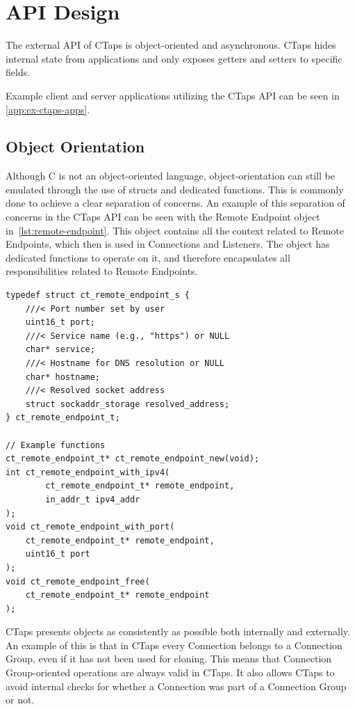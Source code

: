 \section{API Design}
The external API of CTaps is object-oriented and asynchronous.
CTaps hides internal state from applications and only exposes getters and setters
to specific fields.

Example client and server applications utilizing the CTaps
API can be seen in \cref{app:ex-ctaps-apps}.

\subsection{Object Orientation}
Although C is not an object-oriented language, object-orientation can still
be emulated through the use of structs and dedicated functions.
This is commonly done to achieve a clear separation of concerns.
An example of this separation of concerns in the CTaps API
can be seen with the Remote Endpoint object in~\cref{lst:remote-endpoint}.
This object contains all the context related to Remote Endpoints, which then is used
in Connections and Listeners. The object has dedicated functions to operate
on it, and therefore encapsulates all responsibilities related to Remote Endpoints.

\begin{listing}[htbp]
\begin{verbatim}
typedef struct ct_remote_endpoint_s {
    ///< Port number set by user
    uint16_t port;
    ///< Service name (e.g., "https") or NULL
    char* service;
    ///< Hostname for DNS resolution or NULL
    char* hostname;
    ///< Resolved socket address
    struct sockaddr_storage resolved_address;
} ct_remote_endpoint_t;

// Example functions
ct_remote_endpoint_t* ct_remote_endpoint_new(void);
int ct_remote_endpoint_with_ipv4(
        ct_remote_endpoint_t* remote_endpoint,
        in_addr_t ipv4_addr
);
void ct_remote_endpoint_with_port(
    ct_remote_endpoint_t* remote_endpoint,
    uint16_t port
);
void ct_remote_endpoint_free(
    ct_remote_endpoint_t* remote_endpoint
);
\end{verbatim}
\caption[Remote Endpoint structure]
{The internal definition of a Remote Endpoint in CTaps, with example functions from the CTaps API.}
\label{lst:remote-endpoint}
\end{listing}

CTaps presents objects as consistently as possible
both internally and externally.
An example of this is that in CTaps every Connection belongs to a Connection Group,
even if it has not been used for cloning.
This means that Connection Group-oriented operations are always valid
in CTaps. It also allows CTaps to avoid internal checks for whether a Connection was
part of a Connection Group or not.

